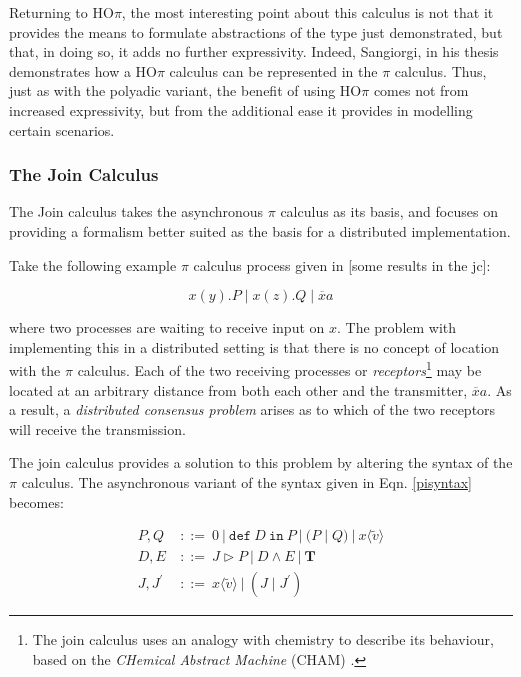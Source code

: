 Returning to HO$\pi$, the most interesting point about this calculus
is not that it provides the means to formulate abstractions of the
type just demonstrated, but that, in doing so, it adds no further
expressivity.  Indeed, Sangiorgi, in his thesis \cite{sangiorgi:phd}
demonstrates how a HO$\pi$ calculus can be represented in the $\pi$
calculus.  Thus, just as with the polyadic variant, the benefit of
using HO$\pi$ comes not from increased expressivity, but from the
additional ease it provides in modelling certain scenarios.

\subsubsection{The Join Calculus}
\label{join}

The Join calculus \cite{join} takes the asynchronous $\pi$ calculus as
its basis, and focuses on providing a formalism better suited as the
basis for a distributed implementation.

Take the following example $\pi$ calculus process given in [some results in the jc]:

\begin{equation}
x(y).P\;|\;x(z).Q\;|\;\overline{x}a
\end{equation}

\noindent where two processes are waiting to receive input on $x$.
The problem with implementing this in a distributed setting is that
there is no concept of location with the $\pi$ calculus.  Each of the
two receiving processes or \emph{receptors}\footnote{The join calculus
  uses an analogy with chemistry to describe its behaviour, based on
  the \emph{CHemical Abstract Machine} (CHAM) \cite{cham}.} may be
located at an arbitrary distance from both each other and the
transmitter, $\overline{x}a$.  As a result, a \emph{distributed
  consensus problem} arises as to which of the two receptors will
receive the transmission.

The join calculus provides a solution to this problem by altering the
syntax of the $\pi$ calculus.  The asynchronous variant of the
syntax given in Eqn. \ref{pisyntax} becomes:

\begin{align}
\label{joinsyntax}
  P, Q\ & ::=\ 
  0\ |\ 
  \mathtt{def}\ D\ \mathtt{in}\ P\ |\
  (P\;|\;Q)\ |\ 
  x\langle \tilde{v} \rangle \\
  D, E\ & ::=\
  J \rhd P\ |\
  D \wedge E\ |\ 
  \mathbf{T} \\
  J,J^\prime\ & ::=\ 
  x\langle \tilde{v} \rangle\ |\
  (J\;|\;J^\prime)
\end{align}

